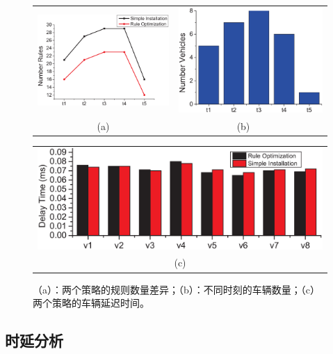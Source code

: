 \documentclass{ctexart}
\begin{document}
\begin{figure} [t]
\begin{center}
\begin{tabular}{cc}
\includegraphics[width=0.5\columnwidth]{figures/fig-e-num-1.eps}&
\hspace {-0.2in}
\includegraphics[width=0.5\columnwidth]{figures/fig-e-num-2.eps} \\
(a) & (b)~~~
\end{tabular}
\begin{tabular}{c}
\includegraphics[width=0.9\columnwidth]{figures/fig-e-8bar-30.eps} \\
(c)
\end{tabular}
\caption{（a）：两个策略的规则数量差异；（b）：不同时刻的车辆数量；（c）两个策略的车辆延迟时间。} \label{fig8b}
  \end{center}
  \vspace{-0.35in}
\end{figure}

\subsection{时延分析}
\end{document}
